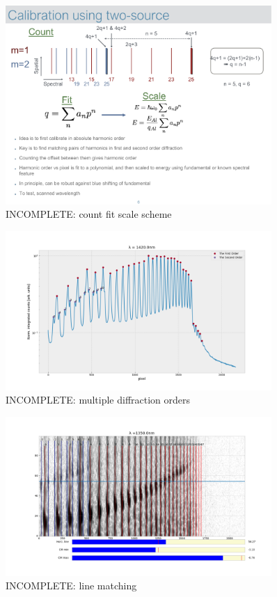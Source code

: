 \begin{figure}
	\centering
	\includegraphics[width=0.9\textwidth]{figures/Beamline/Count_Fit_Scale.pdf}
	\caption{INCOMPLETE: count fit scale scheme}
	\label{fig:count_fit_scale_scheme}
\end{figure}

\begin{figure}
	\centering
	\includegraphics[width=0.9\textwidth]{figures/Beamline/first_second_order_spectrum.png}
	\caption{INCOMPLETE: multiple diffraction orders}
	\label{fig:first_second_order}
\end{figure}

\begin{figure}
	\centering
	\includegraphics[width=0.9\textwidth]{figures/Beamline/line_matching_first_and_second.png}
	\caption{INCOMPLETE: line matching}
	\label{fig:line_matching}
\end{figure}

